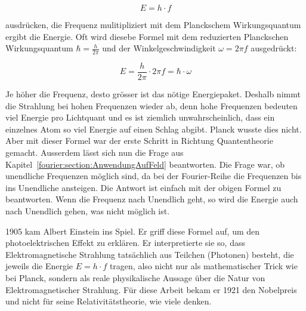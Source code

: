 	\begin{equation}
		E = h \cdot f
	\end{equation}
	
	 ausdrücken, die Frequenz mulitipliziert mit dem Planckschem Wirkungsquantum ergibt die Energie.
	 Oft wird diesebe Formel mit dem reduzierten Planckschen Wirkungsquantum $\hbar = \frac{h}{2\pi}$ und der Winkelgeschwindigkeit $\omega = 2 \pi f$ ausgedrückt:
	 
	 \begin{equation}
		E = \frac{h}{2\pi} \cdot 2\pi f = \hbar \cdot \omega
	 \end{equation}
	 
	 
	Je höher die Frequenz, desto grösser ist das nötige Energiepaket. 
	Deshalb nimmt die Strahlung bei hohen Frequenzen wieder ab, denn hohe Frequenzen bedeuten viel Energie pro Lichtquant und es ist ziemlich unwahrscheinlich, dass ein einzelnes Atom so viel Energie auf einen Schlag abgibt. 
	Planck wusste dies nicht. 
	Aber mit dieser Formel war der erste Schritt in Richtung Quantentheorie gemacht.
	Ausserdem lässt sich nun die Frage aus Kapitel~\ref{fourier:section:AnwendungAufFeld} beantworten. 
	Die Frage war, ob unendliche Frequenzen möglich sind, da bei der Fourier-Reihe die Frequenzen bis ins Unendliche ansteigen. 
	Die Antwort ist einfach mit der obigen Formel zu beantworten. Wenn die Frequenz nach Unendlich geht, so wird die Energie auch nach Unendlich gehen, was nicht möglich ist.

	
	
	
	1905 kam Albert Einstein ins Spiel. 
	Er griff diese Formel auf, um den photoelektrischen Effekt zu erklären. 
	Er interpretierte sie so, dass Elektromagnetische Strahlung tatsächlich aus Teilchen (Photonen) besteht, die jeweils die Energie $E = h \cdot f$ tragen, also nicht nur als mathematischer Trick wie bei Planck, sondern als reale physikalische Aussage über die Natur von Elektromagnetischer Strahlung.
	Für diese Arbeit bekam er 1921 den Nobelpreis und nicht für seine Relativitätstheorie, wie viele denken.
	
	
	
	

